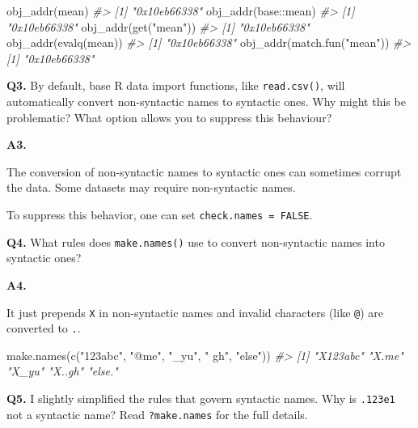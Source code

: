 \documentclass[
]{book}
\newenvironment{Shaded}{\begin{snugshade}}{\end{snugshade}}
\newcommand{\CommentTok}[1]{\textcolor[rgb]{0.56,0.35,0.01}{\textit{#1}}}
\newcommand{\FunctionTok}[1]{\textcolor[rgb]{0.00,0.00,0.00}{#1}}
\newcommand{\NormalTok}[1]{#1}
\newcommand{\SpecialCharTok}[1]{\textcolor[rgb]{0.00,0.00,0.00}{#1}}
\newcommand{\StringTok}[1]{\textcolor[rgb]{0.31,0.60,0.02}{#1}}
\begin{document}
\begin{Shaded}
\begin{Highlighting}[]
\FunctionTok{obj\_addr}\NormalTok{(mean)}
\CommentTok{\#\textgreater{} [1] "0x10eb66338"}
\FunctionTok{obj\_addr}\NormalTok{(base}\SpecialCharTok{::}\NormalTok{mean)}
\CommentTok{\#\textgreater{} [1] "0x10eb66338"}
\FunctionTok{obj\_addr}\NormalTok{(}\FunctionTok{get}\NormalTok{(}\StringTok{"mean"}\NormalTok{))}
\CommentTok{\#\textgreater{} [1] "0x10eb66338"}
\FunctionTok{obj\_addr}\NormalTok{(}\FunctionTok{evalq}\NormalTok{(mean))}
\CommentTok{\#\textgreater{} [1] "0x10eb66338"}
\FunctionTok{obj\_addr}\NormalTok{(}\FunctionTok{match.fun}\NormalTok{(}\StringTok{"mean"}\NormalTok{))}
\CommentTok{\#\textgreater{} [1] "0x10eb66338"}
\end{Highlighting}
\end{Shaded}

\textbf{Q3.} By default, base R data import functions, like \texttt{read.csv()}, will automatically convert non-syntactic names to syntactic ones. Why might this be problematic? What option allows you to suppress this behaviour?

\textbf{A3.}

The conversion of non-syntactic names to syntactic ones can sometimes corrupt the data. Some datasets may require non-syntactic names.

To suppress this behavior, one can set \texttt{check.names\ =\ FALSE}.

\textbf{Q4.} What rules does \texttt{make.names()} use to convert non-syntactic names into syntactic ones?

\textbf{A4.}

It just prepends \texttt{X} in non-syntactic names and invalid characters (like \texttt{@}) are converted to \texttt{.}.

\begin{Shaded}
\begin{Highlighting}[]
\FunctionTok{make.names}\NormalTok{(}\FunctionTok{c}\NormalTok{(}\StringTok{"123abc"}\NormalTok{, }\StringTok{"@me"}\NormalTok{, }\StringTok{"\_yu"}\NormalTok{, }\StringTok{"  gh"}\NormalTok{, }\StringTok{"else"}\NormalTok{))}
\CommentTok{\#\textgreater{} [1] "X123abc" "X.me"    "X\_yu"    "X..gh"   "else."}
\end{Highlighting}
\end{Shaded}

\textbf{Q5.} I slightly simplified the rules that govern syntactic names. Why is \texttt{.123e1} not a syntactic name? Read \texttt{?make.names} for the full details.
\end{document}
